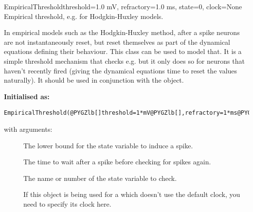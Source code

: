 \documentclass[letterpaper,10pt,english]{manual}
\begin{document}
\hypertarget{brian.EmpiricalThreshold}{}\begin{classdesc}{EmpiricalThreshold}{threshold=1.0 mV, refractory=1.0 ms, state=0, clock=None}
Empirical threshold, e.g. for Hodgkin-Huxley models.

In empirical models such as the Hodgkin-Huxley method, after a spike
neurons are not instantaneously reset, but reset themselves
as part of the dynamical equations defining their behaviour. This class
can be used to model that. It is a simple threshold mechanism that
checks e.g.  but it only does so for neurons that haven't
recently fired (giving the dynamical equations time to reset
the values naturally). It should be used in conjunction with the
\hyperlink{brian.NoReset}{} object.

\textbf{Initialised as:}

\begin{Verbatim}[commandchars=@\[\]]
EmpiricalThreshold(@PYGZlb[]threshold=1*mV@PYGZlb[],refractory=1*ms@PYGZlb[],state=0@PYGZlb[],clock@PYGZrb[]@PYGZrb[]@PYGZrb[]@PYGZrb[])
\end{Verbatim}

with arguments:
\begin{description}
\item[]
The lower bound for the state variable to induce a spike.

\item[]
The time to wait after a spike before checking for spikes again.

\item[]
The name or number of the state variable to check.

\item[]
If this object is being used for a \hyperlink{brian.NeuronGroup}{} which doesn't
use the default clock, you need to specify its clock here.

\end{description}
\end{classdesc}
\end{document}
